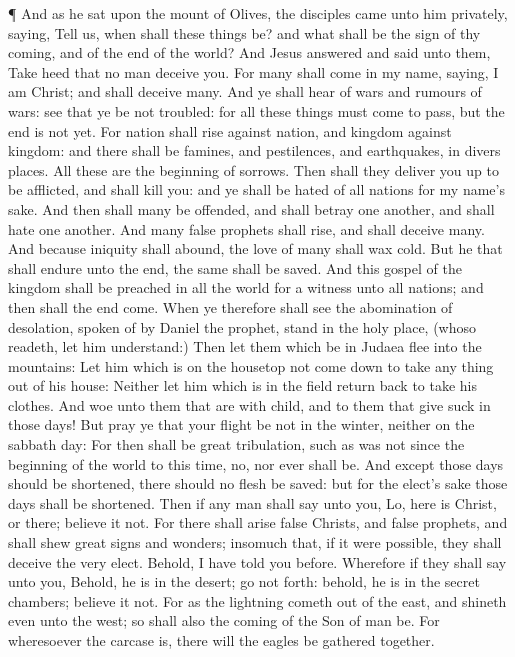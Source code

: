  ¶ And as he sat upon the mount of Olives, the disciples
came unto him privately, saying, Tell us, when shall these things be?
and what shall be the sign of thy coming, and of the end of the world?
 And Jesus answered and said unto them, Take heed that no
man deceive you.  For many shall come in my name, saying, I
am Christ; and shall deceive many.  And ye shall hear of
wars and rumours of wars: see that ye be not troubled: for all these
things must come to pass, but the end is not yet.  For
nation shall rise against nation, and kingdom against kingdom: and there
shall be famines, and pestilences, and earthquakes, in divers places.
 All these are the beginning of sorrows.  Then
shall they deliver you up to be afflicted, and shall kill you: and ye
shall be hated of all nations for my name's sake.  And then
shall many be offended, and shall betray one another, and shall hate one
another.  And many false prophets shall rise, and shall
deceive many.  And because iniquity shall abound, the love
of many shall wax cold.  But he that shall endure unto the
end, the same shall be saved.  And this gospel of the
kingdom shall be preached in all the world for a witness unto all
nations; and then shall the end come.  When ye therefore
shall see the abomination of desolation, spoken of by Daniel the
prophet, stand in the holy place, (whoso readeth, let him understand:)
 Then let them which be in Judaea flee into the mountains:
 Let him which is on the housetop not come down to take any
thing out of his house:  Neither let him which is in the
field return back to take his clothes.  And woe unto them
that are with child, and to them that give suck in those days!
 But pray ye that your flight be not in the winter, neither
on the sabbath day:  For then shall be great tribulation,
such as was not since the beginning of the world to this time, no, nor
ever shall be.  And except those days should be shortened,
there should no flesh be saved: but for the elect's sake those days
shall be shortened.  Then if any man shall say unto you,
Lo, here is Christ, or there; believe it not.  For there
shall arise false Christs, and false prophets, and shall shew great
signs and wonders; insomuch that, if it were possible, they shall
deceive the very elect.  Behold, I have told you before.
 Wherefore if they shall say unto you, Behold, he is in the
desert; go not forth: behold, he is in the secret chambers; believe it
not.  For as the lightning cometh out of the east, and
shineth even unto the west; so shall also the coming of the Son of man
be.  For wheresoever the carcase is, there will the eagles
be gathered together.

